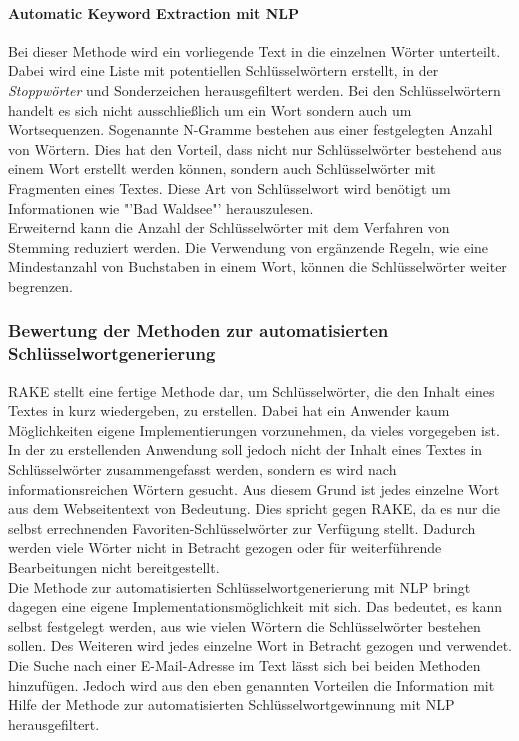 			\paragraph{Automatic Keyword Extraction mit NLP}
			Bei dieser Methode wird ein vorliegende Text in die einzelnen Wörter unterteilt. Dabei wird eine Liste mit potentiellen Schlüsselwörtern erstellt, in der \textit{Stoppwörter} und Sonderzeichen herausgefiltert werden. Bei den Schlüsselwörtern handelt es sich nicht ausschließlich um ein Wort sondern auch um Wortsequenzen. Sogenannte N-Gramme bestehen aus einer festgelegten Anzahl von Wörtern. Dies hat den Vorteil, dass nicht nur Schlüsselwörter bestehend aus einem Wort erstellt werden können, sondern auch Schlüsselwörter mit Fragmenten eines Textes. Diese Art von Schlüsselwort wird benötigt um Informationen wie "'Bad Waldsee"' herauszulesen.\\
			Erweiternd kann die Anzahl der Schlüsselwörter mit dem Verfahren von Stemming reduziert werden. Die Verwendung von ergänzende Regeln, wie eine Mindestanzahl von Buchstaben in einem Wort, können die Schlüsselwörter weiter begrenzen.
	
		\subsubsection{Bewertung der Methoden zur automatisierten Schlüsselwortgenerierung}
		RAKE stellt eine fertige Methode dar, um Schlüsselwörter, die den Inhalt eines Textes in kurz wiedergeben, zu erstellen. Dabei hat ein Anwender kaum Möglichkeiten eigene Implementierungen vorzunehmen, da vieles vorgegeben ist. In der zu erstellenden Anwendung soll jedoch nicht der Inhalt eines Textes in Schlüsselwörter zusammengefasst werden, sondern es wird nach informationsreichen Wörtern gesucht. Aus diesem Grund ist jedes einzelne Wort aus dem Webseitentext von Bedeutung. Dies spricht gegen RAKE, da es nur die selbst errechnenden Favoriten-Schlüsselwörter zur Verfügung stellt. Dadurch werden viele Wörter nicht in Betracht gezogen oder für weiterführende Bearbeitungen nicht bereitgestellt.\\
		Die Methode zur automatisierten Schlüsselwortgenerierung mit NLP bringt dagegen eine eigene Implementationsmöglichkeit mit sich. Das bedeutet, es kann selbst festgelegt werden, aus wie vielen Wörtern die Schlüsselwörter bestehen sollen. Des Weiteren wird jedes einzelne Wort in Betracht gezogen und verwendet.\\ Die Suche nach einer E-Mail-Adresse im Text lässt sich bei beiden Methoden hinzufügen. Jedoch wird aus den eben genannten Vorteilen die Information mit Hilfe der Methode zur automatisierten Schlüsselwortgewinnung mit NLP herausgefiltert.
		
